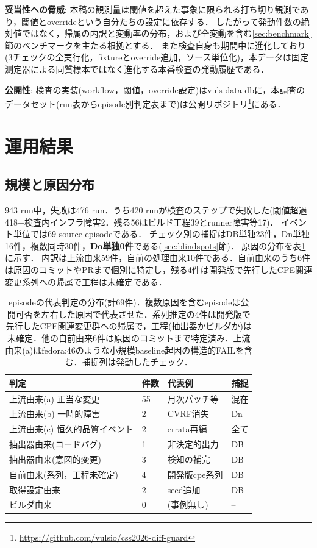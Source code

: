 \documentclass{css}
\begin{document}
\textbf{妥当性への脅威}:
本稿の観測量は閾値を超えた事象に限られる打ち切り観測であり，閾値とoverrideという自分たちの設定に依存する．
したがって発動件数の絶対値ではなく，帰属の内訳と変動率の分布，および全変動を含む\ref{sec:benchmark}節のベンチマークを主たる根拠とする．
また検査自身も期間中に進化しており(3チェックの全実行化，fixtureとoverride追加，ソース単位化)，本データは固定測定器による同質標本ではなく進化する本番検査の発動履歴である．

\textbf{公開性}:
検査の実装(workflow，閾値，override設定)はvuls-data-db\cite{vuls-data-db}に，本調査のデータセット(run表からepisode別判定表まで)は公開リポジトリ\footnote{\url{https://github.com/vulsio/css2026-diff-guard}}にある．

\section{運用結果}
\label{sec:results}

\subsection{規模と原因分布}
\label{sec:scale}

943 run中，失敗は476 run．うち420 runが検査のステップで失敗した(閾値超過418+検査内インフラ障害2．残る56はビルド工程39とrunner障害等17)．
イベント単位では69 source-episodeである．
チェック別の捕捉はDB単独23件，Dn単独16件，複数同時30件，\textbf{Do単独0件}である(\ref{sec:blindspots}節)．
原因の分布を表\ref{tab:attribution}に示す．
内訳は上流由来59件，自前の処理由来10件である．自前由来のうち6件は原因のコミットやPRまで個別に特定し，残る4件は開発版で先行したCPE関連変更系列への帰属で工程は未確定である．

\begin{table}[tb]
\caption{episodeの代表判定の分布(計69件)．複数原因を含むepisodeは公開可否を左右した原因で代表させた．系列推定の4件は開発版で先行したCPE関連変更群への帰属で，工程(抽出器かビルダか)は未確定．他の自前由来6件は原因のコミットまで特定済み．上流由来(a)はfedora:46のような小規模baseline起因の構造的FAILを含む．捕捉列は発動したチェック．}
\label{tab:attribution}
\centering
\small
\setlength{\tabcolsep}{3pt}
\vspace{4pt}
\begin{tabular}{llll}
\hline
判定 & 件数 & 代表例 & 捕捉 \\
\hline
上流由来(a) 正当な変更 & 55 & 月次パッチ等 & 混在 \\
上流由来(b) 一時的障害 & 2 & CVRF消失 & Dn \\
上流由来(c) 恒久的品質イベント & 2 & errata再編 & 全て \\
抽出器由来(コードバグ) & 1 & 非決定的出力 & DB \\
抽出器由来(意図的変更) & 3 & 検知の補完 & DB \\
自前由来(系列，工程未確定) & 4 & 開発版cpe系列 & DB \\
取得設定由来 & 2 & seed追加 & DB \\
ビルダ由来 & 0 & (事例無し) & -- \\
\hline
\end{tabular}
\end{table}
\end{document}
